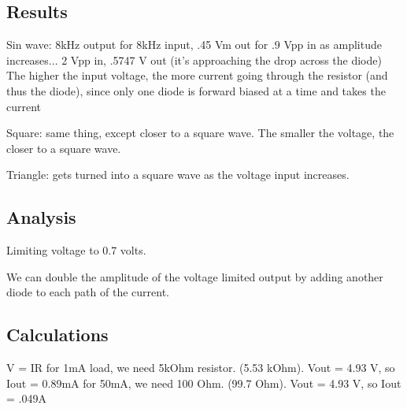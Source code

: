 \documentclass[12pt,letterpaper]{report}
\begin{document}
\subsection*{Results}

Sin wave: 8kHz output for 8kHz input, .45 Vm out for .9 Vpp in
as amplitude increases... 2 Vpp in, .5747 V out (it's approaching the drop across the diode)
The higher the input voltage, the more current going through the resistor (and thus the diode), since only one diode is forward biased at a time and takes the current

Square: same thing, except closer to a square wave. The smaller the voltage, the closer to a square wave.

Triangle: gets turned into a square wave as the voltage input increases. 

\subsection*{Analysis}

Limiting voltage to 0.7 volts. 

We can double the amplitude of the voltage limited output by adding another diode to each path of the current. 

\subsection*{Calculations}

V = IR
for 1mA load, we need 5kOhm resistor. (5.53 kOhm). Vout = 4.93 V, so Iout = 0.89mA
for 50mA, we need 100 Ohm. (99.7 Ohm). Vout = 4.93 V, so Iout = .049A
\end{document}
